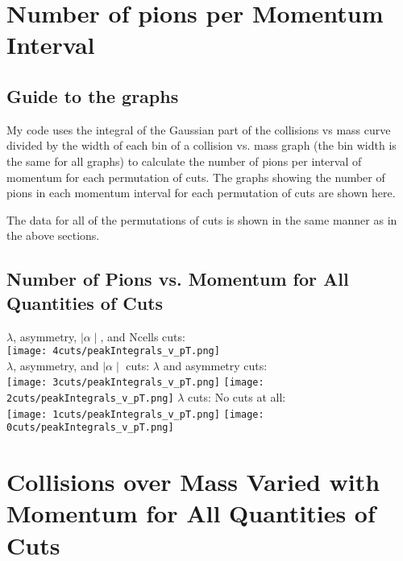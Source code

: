 \documentclass[11pt]{article}
\begin{document}
\section{Number of pions per Momentum Interval} %
\subsection{Guide to the graphs} %
My code uses the integral of the Gaussian part of the collisions vs mass curve divided by the width of each bin of a collision vs. mass graph (the bin width is the same for all graphs) to calculate the number of pions per interval of momentum for each permutation of cuts. The graphs showing the number of pions in each momentum interval for each permutation of cuts are shown here.

The data for all of the permutations of cuts is shown in the same manner as in the above sections.

\subsection{Number of Pions vs. Momentum for All Quantities of Cuts} %
\begin{frame}{}
$\lambda$, asymmetry, $\mid\alpha\mid$, and Ncells cuts:\\
\texttt{[image: 4cuts/peakIntegrals\_v\_pT.png]}\\
$\lambda$, asymmetry, and $\mid\alpha\mid$ cuts:
\noindent\hspace{3 cm}$\lambda$ and asymmetry cuts:\\
\texttt{[image: 3cuts/peakIntegrals\_v\_pT.png]}
\texttt{[image: 2cuts/peakIntegrals\_v\_pT.png]}
$\lambda$ cuts:
\noindent\hspace{4 cm} No cuts at all:\\
\texttt{[image: 1cuts/peakIntegrals\_v\_pT.png]}
\texttt{[image: 0cuts/peakIntegrals\_v\_pT.png]}
\end{frame}

\section{Collisions over Mass Varied with Momentum for All Quantities of Cuts} %
\end{document}
